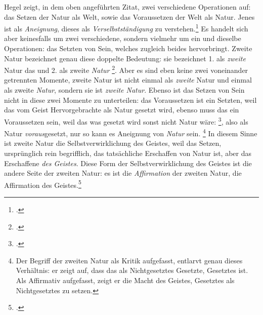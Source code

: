 \documentclass[12pt, a4paper, openany]{report}
\begin{document}
Hegel zeigt, in dem oben angeführten Zitat, zwei verschiedene Operationen auf: 
das Setzen der Natur als Welt, sowie das Voraussetzen der Welt als Natur.
Jenes ist als \emph{Aneignung}, dieses als \emph{Verselbstständigung} zu verstehen.\footcite[Vgl][141]{menke_autonomie_2018}
Es handelt sich aber keinesfalls um zwei verschiedene, sondern vielmehr um ein und dieselbe Operationen: 
das Setzten von Sein, welches zugleich beides hervorbringt.
Zweite Natur bezeichnet genau diese doppelte Bedeutung: 
sie bezeichnet 1. als \emph{zweite} Natur das  und 2. als zweite \emph{Natur} \footcite[][142]{menke_autonomie_2018}.
Aber es sind eben keine zwei voneinander getrennten Momente, zweite Natur ist nicht einmal als \emph{zweite} Natur und einmal als zweite \emph{Natur}, sondern sie ist \emph{zweite Natur}.
Ebenso ist das Setzen von Sein nicht in diese zwei Momente zu unterteilen:
das Voraussetzen ist ein Setzten, weil das vom Geist Hervorgebrachte als Natur gesetzt wird,
ebenso muss das  ein Voraussetzen sein, weil das was gesetzt wird sonst nicht Natur wäre: 
\footcite[][142]{menke_autonomie_2018}, also als Natur \emph{voraus}gesetzt, nur so kann es Aneignung von \emph{Natur} sein.%
\footnote{
    Der Begriff der zweiten Natur als Kritik aufgefasst, entlarvt genau dieses Verhältnis: er zeigt auf, dass das als Nichtgesetztes Gesetzte, Gesetztes ist.
    Als Affirmativ aufgefasst, zeigt er die Macht des Geistes, Gesetztes als Nichtgesetztes zu setzen.
}
In diesem Sinne ist zweite Natur die Selbstverwirklichung des Geistes, weil das Setzen, ursprünglich rein begrifflich, das tatsächliche Erschaffen von Natur ist, aber das Erschaffene \emph{des Geistes}.
Diese Form der Selbstverwirklichung des Geistes ist die andere Seite der zweiten Natur: es ist die \emph{Affirmation} der zweiten Natur, die Affirmation des Geistes.\footcite[Vgl.][143]{menke_autonomie_2018}\\
\end{document}
